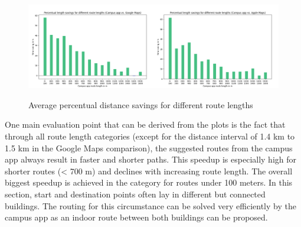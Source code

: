 \begin{figure}[H]
	\centering
	\includegraphics[width=1.0\textwidth]{images/length_differences.png}\\
	\caption{Average percentual distance savings for different route lengths}
\end{figure}

One main evaluation point that can be derived from the plots is the fact that through all route length categories (except for the distance interval of 1.4 km to 1.5 km in the Google Maps comparison), the suggested routes from the campus app always result in faster and shorter paths. This speedup is especially high for shorter routes (< 700 m) and declines with increasing route length. The overall biggest speedup is achieved in the category for routes under 100 meters. In this section, start and destination points often lay in different but connected buildings. The routing for this circumstance can be solved very efficiently by the campus app as an indoor route between both buildings can be proposed.

